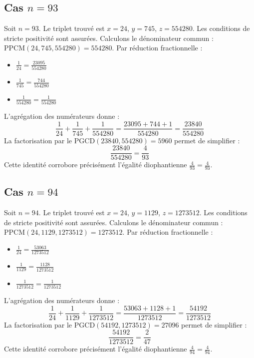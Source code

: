 \documentclass[11pt,a4paper]{article}
\begin{document}
\subsection{Cas $n = 93$}
Soit $n = 93$. Le triplet trouvé est $x = 24$, $y = 745$, $z = 554280$.
Les conditions de stricte positivité sont assurées.
Calculons le dénominateur commun : $\text{PPCM}(24, 745, 554280) = 554280$.
Par réduction fractionnelle :
\begin{itemize}
    \item $\frac{1}{24} = \frac{23095}{554280}$
    \item $\frac{1}{745} = \frac{744}{554280}$
    \item $\frac{1}{554280} = \frac{1}{554280}$
\end{itemize}
L'agrégation des numérateurs donne :
$$ \frac{1}{24} + \frac{1}{745} + \frac{1}{554280} = \frac{23095 + 744 + 1}{554280} = \frac{23840}{554280} $$
La factorisation par le $\text{PGCD}(23840, 554280) = 5960$ permet de simplifier :
$$ \frac{23840}{554280} = \frac{4}{93} $$
Cette identité corrobore précisément l'égalité diophantienne $\frac{4}{93} = \frac{4}{93}$.

\subsection{Cas $n = 94$}
Soit $n = 94$. Le triplet trouvé est $x = 24$, $y = 1129$, $z = 1273512$.
Les conditions de stricte positivité sont assurées.
Calculons le dénominateur commun : $\text{PPCM}(24, 1129, 1273512) = 1273512$.
Par réduction fractionnelle :
\begin{itemize}
    \item $\frac{1}{24} = \frac{53063}{1273512}$
    \item $\frac{1}{1129} = \frac{1128}{1273512}$
    \item $\frac{1}{1273512} = \frac{1}{1273512}$
\end{itemize}
L'agrégation des numérateurs donne :
$$ \frac{1}{24} + \frac{1}{1129} + \frac{1}{1273512} = \frac{53063 + 1128 + 1}{1273512} = \frac{54192}{1273512} $$
La factorisation par le $\text{PGCD}(54192, 1273512) = 27096$ permet de simplifier :
$$ \frac{54192}{1273512} = \frac{2}{47} $$
Cette identité corrobore précisément l'égalité diophantienne $\frac{4}{94} = \frac{4}{94}$.
\end{document}
